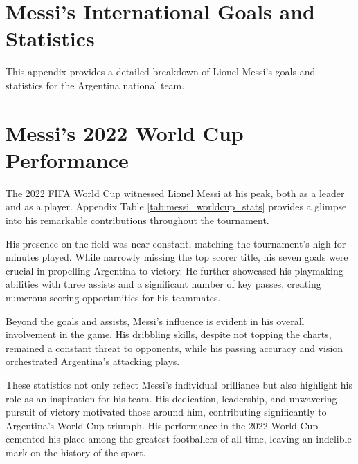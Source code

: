 
\section{Messi's International Goals and Statistics}

This appendix provides a detailed breakdown of Lionel Messi's goals and 
statistics for the Argentina national team. 



\section{Messi's 2022 World Cup Performance}

The 2022 FIFA World Cup witnessed Lionel Messi at his peak, both as a leader 
and as a player.
Appendix Table \ref{tab:messi_worldcup_stats} provides a glimpse into his 
remarkable contributions throughout the tournament. 

His presence on the field was near-constant, matching the tournament's high for 
minutes played. 
While narrowly missing the top scorer title, his seven goals were crucial in 
propelling Argentina to victory. 
He further showcased his playmaking abilities with three assists and a 
significant number of key passes, creating numerous scoring opportunities 
for his teammates.



Beyond the goals and assists, Messi's influence is evident in his overall 
involvement in the game. 
His dribbling skills, despite not topping the charts, remained a constant 
threat to opponents, while his passing accuracy and vision orchestrated 
Argentina's attacking plays. 

These statistics not only reflect Messi's individual brilliance but also 
highlight his role as an inspiration for his team. 
His dedication, leadership, and unwavering pursuit of victory motivated those 
around him, contributing significantly to Argentina's World Cup triumph.
His performance in the 2022 World Cup cemented his place among the greatest 
footballers of all time, leaving an indelible mark on the history of the sport.